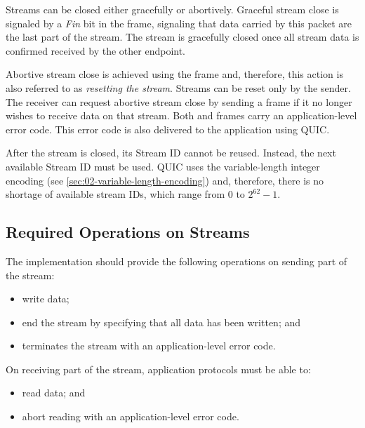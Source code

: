 Streams can be closed either gracefully or abortively. Graceful stream close is signaled by a
\textit{Fin} bit in the \STREAM{} frame, signaling that data carried by this packet are the last
part of the stream. The stream is gracefully closed once all stream data is confirmed received by
the other endpoint.

Abortive stream close is achieved using the \RESETSTREAM{} frame and, therefore, this action is also
referred to as \textit{resetting the stream}. Streams can be reset only by the sender. The receiver
can request abortive stream close by sending a \STOPSENDING{} frame if it no longer wishes to
receive data on that stream. Both \RESETSTREAM{} and \STOPSENDING{} frames carry an
application-level error code. This error code is also delivered to the application using QUIC.

After the stream is closed, its Stream ID cannot be reused. Instead, the next available Stream ID
must be used. QUIC uses the variable-length integer encoding (see
\autoref{sec:02-variable-length-encoding}) and, therefore, there is no shortage of available stream
IDs, which range from 0 to $2^{62}-1$.

\subsection{Required Operations on Streams}

The implementation should provide the following operations on sending part of the stream:

\begin{itemize}

  \item write data;

  \item end the stream by specifying that all data has been written; and

  \item terminates the stream with an application-level error code.

\end{itemize}

On receiving part of the stream, application protocols must be able to:

\begin{itemize}

  \item read data; and

  \item abort reading with an application-level error code.

\end{itemize}

